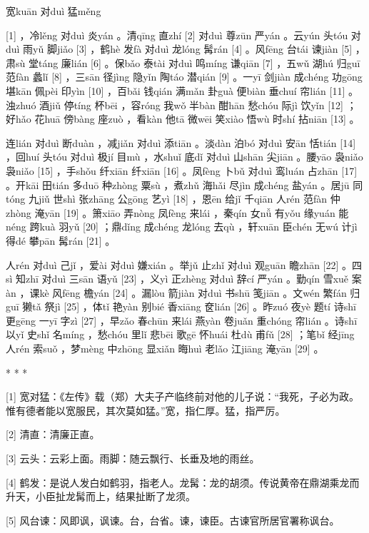 \documentclass[12pt,UTF8]{ctexbook}
\begin{document}
宽kuān 对duì 猛měng





[1] ，冷lěng 对duì 炎yán 。清qīng 直zhí [2] 对duì 尊zūn 严yán 。云yún 头tóu 对duì 雨yǔ 脚jiǎo [3] ，鹤hè 发fà 对duì 龙lóng 髯rán [4] 。风fēng 台tái 谏jiàn [5] ，肃sù 堂táng 廉lián [6] 。保bǎo 泰tài 对duì 鸣míng 谦qiān [7] ，五wǔ 湖hú 归guī 范fàn 蠡lǐ [8] ，三sān 径jìng 隐yǐn 陶táo 潜qián [9] 。一yī 剑jiàn 成chéng 功gōng 堪kān 佩pèi 印yìn [10] ，百bǎi 钱qián 满mǎn 卦guà 便biàn 垂chuí 帘lián [11] 。浊zhuó 酒jiǔ 停tíng 杯bēi ，容róng 我wǒ 半bàn 酣hān 愁chóu 际jì 饮yǐn [12] ；好hǎo 花huā 傍bàng 座zuò ，看kàn 他tā 微wēi 笑xiào 悟wù 时shí 拈niān [13] 。

连lián 对duì 断duàn ，减jiǎn 对duì 添tiān 。淡dàn 泊bó 对duì 安ān 恬tián [14] ，回huí 头tóu 对duì 极jí 目mù ，水shuǐ 底dǐ 对duì 山shān 尖jiān 。腰yāo 袅niǎo 袅niǎo [15] ，手shǒu 纤xiān 纤xiān [16] 。凤fèng 卜bǔ 对duì 鸾luán 占zhān [17] 。开kāi 田tián 多duō 种zhòng 粟sù ，煮zhǔ 海hǎi 尽jìn 成chéng 盐yán 。居jū 同tóng 九jiǔ 世shì 张zhāng 公gōng 艺yì [18] ，恩ēn 给jǐ 千qiān 人rén 范fàn 仲zhòng 淹yān [19] 。箫xiāo 弄nòng 凤fèng 来lái ，秦qín 女nǚ 有yǒu 缘yuán 能néng 跨kuà 羽yǔ [20] ；鼎dǐng 成chéng 龙lóng 去qù ，轩xuān 臣chén 无wú 计jì 得dé 攀pān 髯rán [21] 。

人rén 对duì 己jǐ ，爱ài 对duì 嫌xián 。举jǔ 止zhǐ 对duì 观guān 瞻zhān [22] 。四sì 知zhī 对duì 三sān 语yǔ [23] ，义yì 正zhèng 对duì 辞cí 严yán 。勤qín 雪xuě 案àn ，课kè 风fēng 檐yán [24] 。漏lòu 箭jiàn 对duì 书shū 笺jiān 。文wén 繁fán 归guī 獭tǎ 祭jì [25] ，体tǐ 艳yàn 别bié 香xiāng 奁lián [26] 。昨zuó 夜yè 题tí 诗shī 更gēng 一yī 字zì [27] ，早zǎo 春chūn 来lái 燕yàn 卷juǎn 重chóng 帘lián 。诗shī 以yǐ 史shǐ 名míng ，愁chóu 里lǐ 悲bēi 歌gē 怀huái 杜dù 甫fǔ [28] ；笔bǐ 经jīng 人rén 索suǒ ，梦mèng 中zhōng 显xiǎn 晦huì 老lǎo 江jiāng 淹yān [29] 。



* * *



[1] 宽对猛：《左传》载（郑）大夫子产临终前对他的儿子说：“我死，子必为政。惟有德者能以宽服民，其次莫如猛。”宽，指仁厚。猛，指严厉。

[2] 清直：清廉正直。

[3] 云头：云彩上面。雨脚：随云飘行、长垂及地的雨丝。

[4] 鹤发：是说人发白如鹤羽，指老人。龙髯：龙的胡须。传说黄帝在鼎湖乘龙而升天，小臣扯龙髯而上，结果扯断了龙须。

[5] 风台谏：风即讽，讽谏。台，台省。谏，谏臣。古谏官所居官署称讽台。
\end{document}
